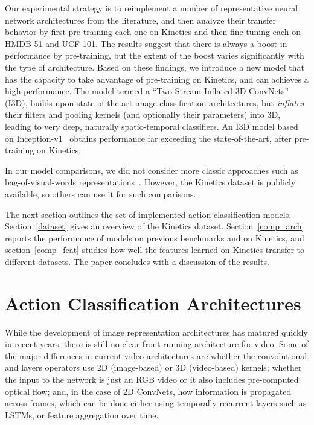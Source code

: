 \documentclass[10pt,twocolumn,letterpaper]{article}
\begin{document}
Our experimental strategy is to reimplement a number of representative
neural network architectures from the literature, and then analyze their transfer
behavior by first pre-training each one on Kinetics and then
fine-tuning each on HMDB-51 and UCF-101. The results suggest that there
is always a boost in performance by pre-training, but the extent of
the boost varies significantly with the type of architecture. Based on
these findings, we introduce a new model that has the capacity to take
advantage of pre-training on Kinetics, and can achieves a high
performance.  The model termed a ``Two-Stream Inflated 3D ConvNets''
(I3D), builds upon state-of-the-art image classification
architectures, but \textit{inflates} their filters and pooling kernels
(and optionally their parameters) into 3D, leading to very deep,
naturally spatio-temporal classifiers. An I3D model based on
Inception-v1~\cite{ioffe2015batch} obtains performance far exceeding
the state-of-the-art, after pre-training on Kinetics.

In our model comparisons, we did not consider more classic
approaches such as bag-of-visual-words
representations~\cite{wangICCV13,niebles2008unsupervised,laptev2008learning,fathi2008action}. 
However,
the Kinetics dataset is publicly available, so others can use it for
such comparisons.

The next section outlines the set of implemented action classification models.
Section~\ref{dataset} gives an overview of the Kinetics dataset.
Section~\ref{comp_arch} reports the performance of models on
previous benchmarks and on Kinetics, and section~\ref{comp_feat}
studies how well the features learned on Kinetics transfer to different
datasets. The paper concludes with a discussion of the results.


\section{Action Classification Architectures}
\label{sec:architectures}

While the development of image representation architectures has matured quickly in recent years, there is still no clear front running architecture for video. Some of the major differences in current video architectures are whether the convolutional and layers operators use 2D (image-based) or 3D (video-based) kernels; whether the input to the network is just an RGB video or it also includes pre-computed optical flow; and, in the case of 2D ConvNets, how information is propagated across frames, which can be done either using temporally-recurrent layers such as LSTMs, or feature aggregation over time.
\end{document}
